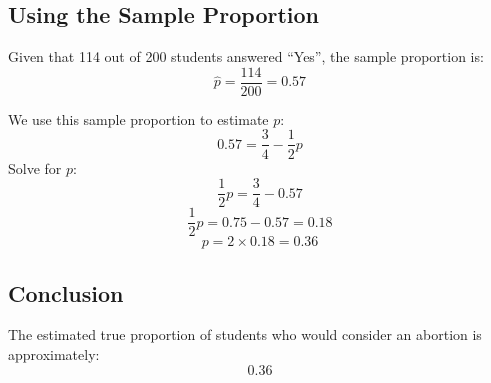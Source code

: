 \documentclass{article}
\begin{document}
\subsection*{Using the Sample Proportion}

Given that 114 out of 200 students answered ``Yes'', the sample proportion is:
\[
\hat{p} = \frac{114}{200} = 0.57
\]

We use this sample proportion to estimate \( p \):
\[
0.57 = \frac{3}{4} - \frac{1}{2}p
\]
Solve for \( p \):
\[
\frac{1}{2}p = \frac{3}{4} - 0.57
\]
\[
\frac{1}{2}p = 0.75 - 0.57 = 0.18
\]
\[
p = 2 \times 0.18 = 0.36
\]

\subsection*{Conclusion}

The estimated true proportion of students who would consider an abortion is approximately:
\[
\boxed{0.36}
\]
\end{document}
